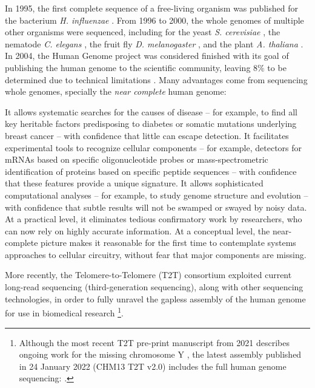 In 1995, the first complete sequence of a free-living organism was published for the bacterium \emph{H. influenzae} \cite{fleischmann:1995vz}. From 1996 to 2000, the whole genomes of multiple other organisms were sequenced, including for the yeast \emph{S. cerevisiae} \cite{goffeau:1996tk}, the nematode \emph{C. elegans} \cite{the-c.-elegans-sequencing-consortium:1998wf}, the fruit fly \emph{D. melanogaster} \cite{myers:2000wk,adams:2000tj}, and the plant \emph{A. thaliana} \cite{the-arabidopsis-genome-initiative:2000tm}. In 2004, the Human Genome project was considered finished with its goal of publishing the human genome to the scientific community, leaving 8\% to be determined due to technical limitations \cite{consortium:2004wi,nurk:2021up}. Many advantages come from sequencing whole genomes, specially the \emph{near complete} human genome:

\begin{displayquote}
It allows systematic searches for the causes of disease -- for example, to find all key heritable factors predisposing to diabetes or somatic mutations underlying breast cancer -- with confidence that little can escape detection. It facilitates experimental tools to recognize cellular components -- for example, detectors for mRNAs based on specific oligonucleotide probes or mass-spectrometric identification of proteins based on specific peptide sequences -- with confidence that these features provide a unique signature. It allows sophisticated computational analyses -- for example, to study genome structure and evolution -- with confidence that subtle results will not be swamped or swayed by noisy data. At a practical level, it eliminates tedious confirmatory work by researchers, who can now rely on highly accurate information. At a conceptual level, the near-complete picture makes it reasonable for the first time to contemplate systems approaches to cellular circuitry, without fear that major components are missing.
\end{displayquote}

More recently, the Telomere-to-Telomere (T2T) consortium exploited current long-read sequencing (third-generation sequencing), along with other sequencing technologies, in order to fully unravel the gapless assembly of the human genome for use in biomedical research \cite{nurk:2021up} \footnote{Although the most recent T2T pre-print manuscript from 2021 describes ongoing work for the missing chromosome Y \cite{nurk:2021up}, the latest assembly published in 24 January 2022 (CHM13 T2T v2.0) includes the full human genome sequencing: .}.

